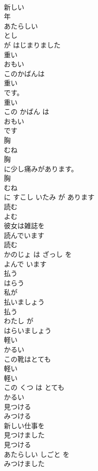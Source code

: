 \documentclass[8pt]{extreport}
\begin{document}
\begin{CJK}{UTF8}{min}
\\	新しい 
\\	年 
\\	あたらしい 
\\	とし
\\	が はじまりました	
\\	重い	
\\	おもい	
\\	このかばんは
\\	重い
\\	です。	
\\	重い 
\\	この かばん は 
\\	おもい
\\	です	
\\	胸	
\\	むね	
\\	胸
\\	に少し痛みがあります。	
\\	胸 
\\	むね
\\	に すこし いたみ が あります	
\\	読む	
\\	よむ	
\\	彼女は雑誌を
\\	読んでいます
\\	読む 
\\	かのじょ は ざっし を 
\\	よんで います
\\	払う	
\\	はらう	
\\	私が
\\	払いましょう
\\	払う 
\\	わたし が 
\\	はらいましょう
\\	軽い	
\\	かるい	
\\	この靴はとても
\\	軽い
\\	軽い 
\\	この くつ は とても 
\\	かるい
\\	見つける	
\\	みつける	
\\	新しい仕事を
\\	見つけました
\\	見つける 
\\	あたらしい しごと を 
\\	みつけました

\end{CJK}
\end{document}
